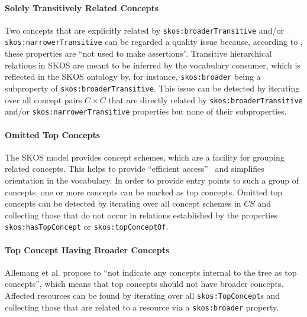 \paragraph{Solely Transitively Related Concepts}

Two concepts that are explicitly related by \texttt{skos:broaderTransitive} and/or \texttt{skos:narrowerTransitive} can be regarded a quality issue because, according to \cite{SkosReference2008}, these properties are ``not used to make assertions''. Transitive hierarchical relations in SKOS are meant to be inferred by the vocabulary consumer, which is reflected in the SKOS ontology by, for instance, \texttt{skos:broader} being a subproperty of \texttt{skos:broaderTransitive}. 
This issue can be detected by iterating over all concept pairs $C \times C$ that are directly related by \texttt{skos:broaderTransitive} and/or \texttt{skos:narrowerTransitive} properties but none of their subproperties.

\paragraph{Omitted Top Concepts}

The SKOS model provides concept schemes, which are a facility for grouping related concepts. This helps to provide ``efficient access''~\cite{Isaac2009} and simplifies orientation in the vocabulary. In order to provide entry points to such a group of concepts, one or more concepts can be marked as top concepts.  
Omitted top concepts can be detected by iterating over all concept schemes in $CS$ and collecting those that do not occur in relations established by the properties \texttt{skos:hasTopConcept} or \texttt{skos:topConceptOf}.

\paragraph{Top Concept Having Broader Concepts}

Allemang et al. \cite{Allemang2011} propose to ``not indicate any concepts internal to the tree as top concepts'', which means that top concepts should not have broader concepts. 
Affected resources can be found by iterating over all \texttt{skos:TopConcept}s and collecting those that are related to a resource via a \texttt{skos:broader} property.


